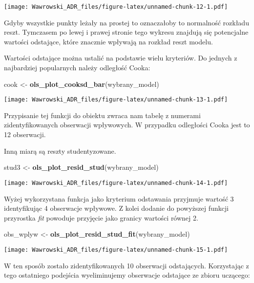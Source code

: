 \documentclass[]{book}
\newenvironment{Shaded}{\begin{snugshade}}{\end{snugshade}}
\newcommand{\KeywordTok}[1]{\textcolor[rgb]{0.13,0.29,0.53}{\textbf{#1}}}
\newcommand{\StringTok}[1]{\textcolor[rgb]{0.31,0.60,0.02}{#1}}
\newcommand{\NormalTok}[1]{#1}
\begin{document}
\texttt{[image: Wawrowski\_ADR\_files/figure-latex/unnamed-chunk-12-1.pdf]}

Gdyby wszystkie punkty leżały na prostej to oznaczałoby to normalność
rozkładu reszt. Tymczasem po lewej i prawej stronie tego wykresu
znajdują się potencjalne wartości odstające, które znacznie wpływają na
rozkład reszt modelu.

Wartości odstające można ustalić na podstawie wielu kryteriów. Do
jednych z najbardziej popularnych należy odległość Cooka:

\begin{Shaded}
\begin{Highlighting}[]
\NormalTok{cook <-}\StringTok{ }\KeywordTok{ols_plot_cooksd_bar}\NormalTok{(wybrany_model)}
\end{Highlighting}
\end{Shaded}

\texttt{[image: Wawrowski\_ADR\_files/figure-latex/unnamed-chunk-13-1.pdf]}

Przypisanie tej funkcji do obiektu zwraca nam tabelę z numerami
zidentyfikowanych obserwacji wpływowych. W przypadku odległości Cooka
jest to 12 obserwacji.

Inną miarą są reszty studentyzowane.

\begin{Shaded}
\begin{Highlighting}[]
\NormalTok{stud3 <-}\StringTok{ }\KeywordTok{ols_plot_resid_stud}\NormalTok{(wybrany_model)}
\end{Highlighting}
\end{Shaded}

\texttt{[image: Wawrowski\_ADR\_files/figure-latex/unnamed-chunk-14-1.pdf]}

Wyżej wykorzystana funkcja jako kryterium odstawania przyjmuje wartość 3
identyfikując 4 obserwacje wpływowe. Z kolei dodanie do powyższej
funkcji przyrostka \emph{fit} powoduje przyjęcie jako granicy wartości
równej 2.

\begin{Shaded}
\begin{Highlighting}[]
\NormalTok{obs_wplyw <-}\StringTok{ }\KeywordTok{ols_plot_resid_stud_fit}\NormalTok{(wybrany_model)}
\end{Highlighting}
\end{Shaded}

\texttt{[image: Wawrowski\_ADR\_files/figure-latex/unnamed-chunk-15-1.pdf]}

W ten sposób zostało zidentyfikowanych 10 obserwacji odstających.
Korzystając z tego ostatniego podejścia wyeliminujemy obserwacje
odstające ze zbioru uczącego:
\end{document}
